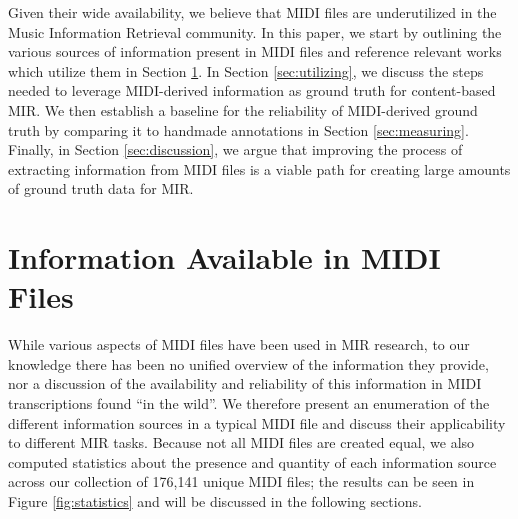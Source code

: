 \documentclass{article}
\begin{document}
Given their wide availability, we believe that MIDI files are underutilized in the Music Information Retrieval community.
In this paper, we start by outlining the various sources of information present in MIDI files and reference relevant works which utilize them in Section \ref{sec:information}.
In Section \ref{sec:utilizing}, we discuss the steps needed to leverage MIDI-derived information as ground truth for content-based MIR.
We then establish a baseline for the reliability of MIDI-derived ground truth by comparing it to handmade annotations in Section \ref{sec:measuring}.
Finally, in Section \ref{sec:discussion}, we argue that improving the process of extracting information from MIDI files is a viable path for creating large amounts of ground truth data for MIR.

\section{Information Available in MIDI Files}
\label{sec:information}

While various aspects of MIDI files have been used in MIR research, to our knowledge there has been no unified overview of the information they provide, nor a discussion of the availability and reliability of this information in MIDI transcriptions found ``in the wild''.
We therefore present an enumeration of the different information sources in a typical MIDI file and discuss their applicability to different MIR tasks.
Because not all MIDI files are created equal, we also computed statistics about the presence and quantity of each information source across our collection of 176,141 unique MIDI files; the results can be seen in Figure \ref{fig:statistics} and will be discussed in the following sections.
\end{document}
